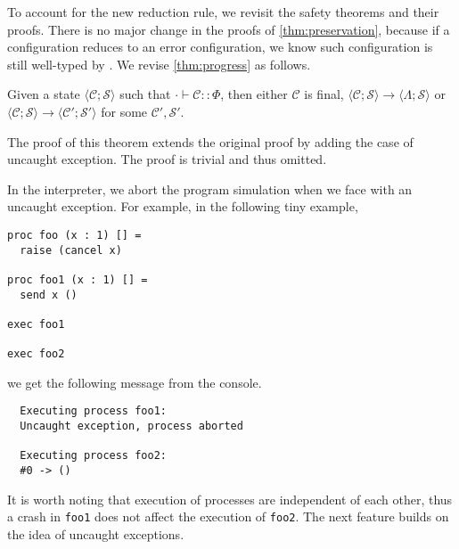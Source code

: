 \documentclass[12pt, openany]{memoir}
\newcommand*{\config}[0]{\mathcal{C}}
\newcommand*{\cancelSet}[0]{\mathcal{S}}
\begin{document}
To account for the new reduction rule, we revisit the safety theorems and their proofs.
There is no major change in the proofs of \cref{thm:preservation}, because if a configuration reduces to an error configuration,
we know such configuration is still well-typed by . We revise \cref{thm:progress} as follows.
\begin{theorem}
  Given a state $\langle \config; \cancelSet \rangle$ such that $\cdot \vdash \config :: \Phi$, then either
  $\config$ is final, $\langle \config; \cancelSet \rangle \longrightarrow \langle \Lambda; \cancelSet \rangle$ or $\langle \config; \cancelSet \rangle \longrightarrow \langle \config'; \cancelSet' \rangle$ for some $\config', \cancelSet'$.
\end{theorem}
The proof of this theorem extends the original proof by adding the case of uncaught exception. The proof is trivial and thus omitted.

In the interpreter, we abort the program simulation when we face with an uncaught exception. For example, in the following tiny example,
\begin{lstlisting}
proc foo (x : 1) [] = 
  raise (cancel x)

proc foo1 (x : 1) [] =
  send x ()

exec foo1

exec foo2
\end{lstlisting}
we get the following message from the console.
\begin{verbatim}
  Executing process foo1:
  Uncaught exception, process aborted

  Executing process foo2:
  #0 -> ()
\end{verbatim}
It is worth noting that execution of processes are independent of each other, thus a crash in \texttt{foo1} does not affect 
the execution of \texttt{foo2}. The next feature builds on the idea of uncaught exceptions.
\end{document}
